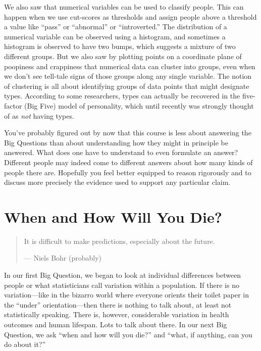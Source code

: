 \documentclass[
  openany]{book}
\begin{document}
We also saw that numerical variables can be used to classify people. This can happen when we use cut-scores as thresholds and assign people above a threshold a value like ``pass'' or ``abnormal'' or ``introverted.'' The distribution of a numerical variable can be observed using a histogram, and sometimes a histogram is observed to have two bumps, which suggests a mixture of two different groups. But we also saw by plotting points on a coordinate plane of poopiness and crappiness that numerical data can cluster into groups, even when we don't see tell-tale signs of those groups along any single variable. The notion of clustering is all about identifying groups of data points that might designate types. According to some researchers, types can actually be recovered in the five-factor (Big Five) model of personality, which until recently was strongly thought of as \emph{not} having types.

You've probably figured out by now that this course is less about answering the Big Questions than about understanding how they might in principle be answered. What does one have to understand to even formulate an answer? Different people may indeed come to different answers about how many kinds of people there are. Hopefully you feel better equipped to reason rigorously and to discuss more precisely the evidence used to support any particular claim.

\hypertarget{when-and-how-will-you-die}{%
\chapter{When and How Will You Die?}\label{when-and-how-will-you-die}}

\begin{quote}
It is difficult to make predictions, especially about the future.

--- Niels Bohr (probably)
\end{quote}

In our first Big Question, we began to look at individual differences between people or what statisticians call variation within a population. If there is no variation---like in the bizarro world where everyone orients their toilet paper in the ``under'' orientation---then there is nothing to talk about, at least not statistically speaking. There is, however, considerable variation in health outcomes and human lifespan. Lots to talk about there. In our next Big Question, we ask ``when and how will you die?'' and ``what, if anything, can you do about it?''
\end{document}
